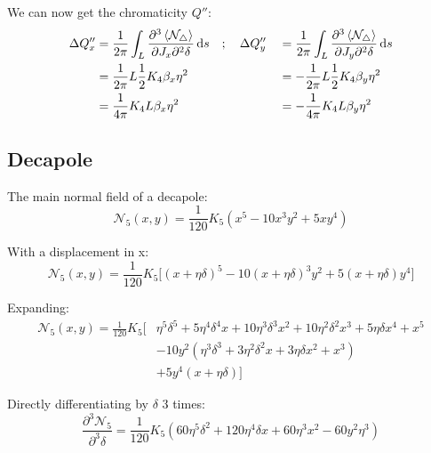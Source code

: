 \documentclass[openright,twoside,headsepline,bibliography=totoc]{scrbook}
\begin{document}
We can now get the chromaticity \(Q''\): \begin{equation}\begin{aligned}
\Delta Q''_x &= \frac{1}{2\pi} \int_L \frac{\partial^3 \left< \mathcal{N_4} \right>}{\partial J_x \partial^2 \delta} \mathop{}\!\mathrm{d} s \quad; \quad \Delta Q''_y &&= \frac{1}{2\pi} \int_L \frac{\partial^3 \left< \mathcal{N_4} \right>}{\partial J_y \partial^2 \delta} \mathop{}\!\mathrm{d} s \\
&= \frac{1}{2 \pi} L \frac{1}{2} K_4 \beta_x \eta^2  &&= - \frac{1}{2 \pi} L \frac{1}{2} K_4 \beta_y \eta^2 \\
&= \frac{1}{4 \pi}  K_4 L \beta_x \eta^2 &&= - \frac{1}{4 \pi}  K_4 L \beta_y \eta^2
\end{aligned}\end{equation}

\hypertarget{decapole-1}{%
\subsection{Decapole}\label{decapole-1}}

The main normal field of a decapole:
\begin{equation}\mathcal{N_5}(x, y) = \frac{1}{120} K_{5} \left(x^5 - 10 x^3y^2 + 5xy^4 \right)\end{equation}

With a displacement in x:
\begin{equation}\mathcal{N_5}(x, y) = \frac{1}{120} K_{5} \biggl[(x+\eta\delta)^5 - 10 (x+\eta\delta)^3y^2 + 5(x+\eta\delta)y^4 \biggr]\end{equation}

Expanding: \begin{equation}\begin{aligned}
\mathcal{N_5}(x, y) = \frac{1}{120} K_{5} \biggl[&
  \eta^5\delta^5 + 5\eta^4\delta^4x + 10\eta^3\delta^3x^2 + 10\eta^2\delta^2 x^3 + 5\eta\delta x^4 + x^5 \\
  & -10y^2 (\eta^3\delta^3 + 3\eta^2\delta^2x + 3\eta\delta x^2 + x^3)\\
  & +5y^4 (x + \eta\delta) \biggr]
\end{aligned}\label{eq:decapole_expanded}\end{equation}

Directly differentiating by \(\delta\) 3 times:
\begin{equation}\frac{\partial^3 \mathcal{N_5}}{\partial^3 \delta} = \frac{1}{120} K_5 \left( 60\eta^5\delta^2 + 120 \eta^4\delta x + 60\eta^3x^2 - 60y^2\eta^3\right)\end{equation}
\end{document}
